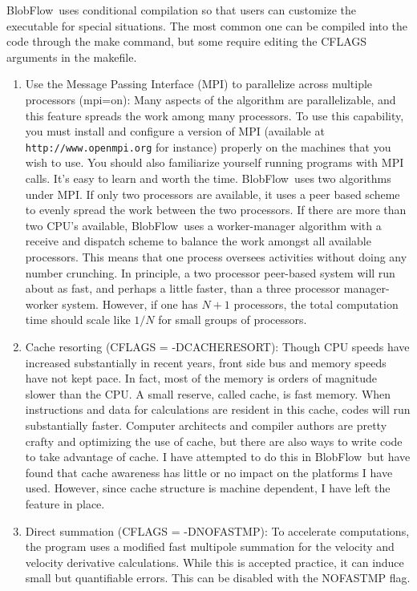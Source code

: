 \documentclass[12pt]{report}
\newcommand{\BF}{BlobFlow}
\begin{document}
\BF~uses conditional compilation so that users can customize the
executable for special situations.  The most common one can be compiled into the
code through the make command, but some require editing the CFLAGS arguments in
the makefile.
\begin{enumerate}

\item Use the Message Passing Interface (MPI) to parallelize across multiple
processors (mpi=on): Many aspects of the algorithm are parallelizable, and
this feature spreads the work among many processors.  To use this
capability, you must install and configure a version of MPI (available at {\tt
http://www.openmpi.org} for instance) properly on the machines that you wish to
use.
You should also familiarize yourself running programs with MPI calls.  It's
easy to learn and worth the time.  \BF~uses two algorithms under MPI.
If only two processors are available, it uses a peer based scheme to evenly
spread the work between the two processors.  If there are more than two
CPU's available, \BF~uses a worker-manager algorithm with a receive and
dispatch scheme to balance the work amongst all available processors.  This
means that one process oversees activities
without doing any number crunching.  In principle, a two processor peer-based
system will run about as fast, and perhaps a little faster, than a three
processor manager-worker system.  However, if one has $N+1$ processors, the
total computation time should scale like $1/N$ for small groups of processors.

\item Cache resorting (CFLAGS = -DCACHERESORT): Though CPU speeds have increased
substantially in recent years, front side bus and memory speeds have not
kept pace.  In fact, most of the memory is orders of
magnitude slower than the CPU.  A small reserve, called cache, is fast
memory.  When instructions and data for calculations are resident in this
cache, codes will run substantially faster.  Computer architects and
compiler authors are pretty crafty and optimizing the use of cache, but
there are also ways to write code to take advantage of cache.  I have
attempted to do this in \BF~but have found that cache awareness has
little or no impact on the platforms I have used.  However, since cache
structure is machine dependent, I have left the feature in place.

\item Direct summation (CFLAGS = -DNOFASTMP):  To accelerate computations, the
program uses a modified fast multipole summation for the velocity and velocity
derivative calculations.  While this is accepted practice, it can induce
small but quantifiable errors.  This can be disabled with the NOFASTMP flag.

\end{enumerate}
\end{document}
